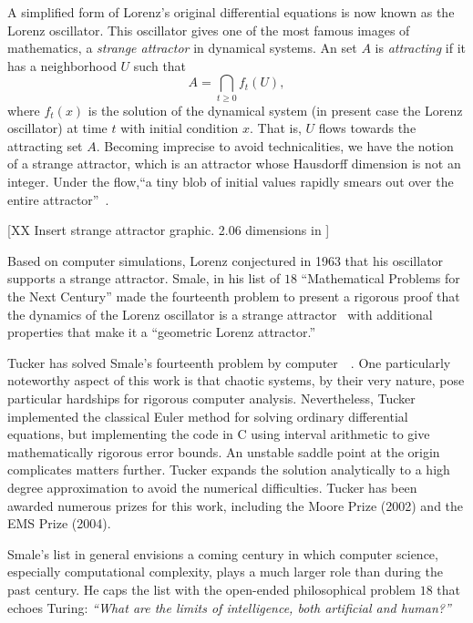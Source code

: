 \documentclass{llncs}
\begin{document}
A simplified form of Lorenz's original differential equations is now
known as the Lorenz oscillator.  This oscillator gives one of the most
famous images of mathematics, a {\it strange attractor} in dynamical
systems.  An {set} $A$ is {\it attracting} if it has a neighborhood
$U$ such that
\[
A = \bigcap_{t\ge 0} f_t(U),
\]
where $f_t(x)$ is the solution of the dynamical system (in present
case the Lorenz oscillator) at time $t$ with initial condition
$x$. That is, $U$ flows towards the attracting set $A$.  
Becoming imprecise to avoid technicalities, we have the notion of a strange
attractor, which is an attractor whose Hausdorff dimension is not an
integer.   Under the flow,``a tiny blob of initial values rapidly 
smears out over the entire attractor''~\cite{WT}.

% 

[XX Insert strange attractor graphic. 2.06 dimensions in ]


Based on computer simulations, Lorenz conjectured in 1963 that his
oscillator supports a strange attractor.  Smale, in his list of $18$
``Mathematical Problems for the Next Century'' made the fourteenth
problem to present a rigorous proof that the dynamics of the Lorenz
oscillator is a strange attractor~\cite{Sma98} with additional
properties that make it a ``geometric Lorenz attractor.''

Tucker has solved Smale's fourteenth problem by
computer~\cite{Tuc02}~\cite{St00}.  One particularly noteworthy aspect
of this work is that chaotic systems, by their very nature, pose
particular hardships for rigorous computer analysis.  Nevertheless,
Tucker implemented the classical Euler method for solving ordinary
differential equations, but implementing the code in C using interval
arithmetic to give mathematically rigorous error bounds.  An unstable
saddle point at the origin complicates matters further. Tucker expands the
solution analytically to a high degree approximation to avoid the
numerical difficulties.  Tucker has been awarded numerous prizes for
this work, including the Moore Prize (2002) and the EMS Prize (2004).

Smale's list in general envisions a coming century in which computer
science, especially computational complexity, plays a much larger
role than during the past century. He caps the list with the
open-ended philosophical problem $18$ that echoes Turing: {\it
  ``What are the limits of intelligence, both artificial and human?''}
\end{document}
